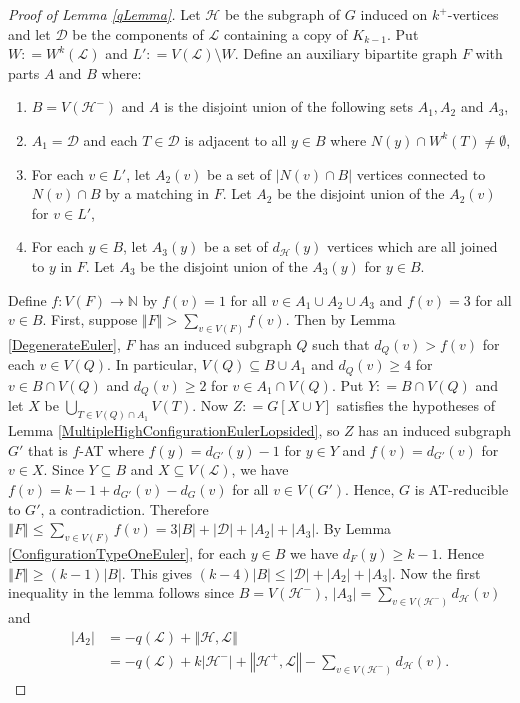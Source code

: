 \documentclass[10pt]{article}
\theoremstyle{plain}
\theoremstyle{definition}
\theoremstyle{remark}
\newcommand{\fancy}[1]{\mathcal{#1}}
\newcommand{\IN}{\mathbb{N}}
\newcommand{\D}{\fancy{D}}
\renewcommand{\L}{\fancy{L}}
\newcommand{\HH}{\fancy{H}}
\newcommand{\card}[1]{\left|#1\right|}
\newcommand{\size}[1]{\left\Vert#1\right\Vert}
\newcommand{\func}[3]{#1\colon #2 \rightarrow #3}
\newcommand{\DefinedAs}{\mathrel{\mathop:}=}
\def\D{\fancy{D}}
\begin{document}
\begin{proof}[Proof of Lemma \ref{qLemma}]
Let $\HH$ be the subgraph of $G$ induced on $k^+$-vertices and let $\D$ be the components of $\L$ containing a copy of $K_{k-1}$. 
Put $W \DefinedAs W^k(\L)$ and $L' \DefinedAs V(\L) \setminus W$. Define an auxiliary bipartite graph $F$ with parts $A$ and $B$ where:
\begin{enumerate}
\item  $B = V(\HH^-)$ and $A$ is the disjoint union of the following sets
$A_1, A_2$ and $A_3$,
\item $A_1 = \D$ and each $T \in \D$ is adjacent to all $y \in B$
where $N(y) \cap W^k(T) \ne \emptyset$,
\item For each $v \in L'$, let $A_2(v)$ be a set of $\card{N(v) \cap
B}$ vertices connected to $N(v) \cap B$ by a matching in $F$.  Let
$A_2$ be the disjoint union of the $A_2(v)$ for $v \in L'$,
\item For each $y \in B$, let $A_3(y)$ be a set of $d_{\HH}(y)$ vertices
which are all joined to $y$ in $F$.  Let $A_3$ be the disjoint union
of the $A_3(y)$ for $y \in B$.
\end{enumerate}

Define $\func{f}{V(F)}{\IN}$ by $f(v) = 1$ for all $v \in A_1 \cup A_2 \cup A_3$ and $f(v) = 3$ for all $v \in B$.  First, suppose $\size{F} > \sum_{v \in V(F)} f(v)$.  
Then by Lemma \ref{DegenerateEuler}, $F$ has an induced subgraph $Q$ such that $d_Q(v) > f(v)$ for each $v \in V(Q)$.  
In particular, $V(Q) \subseteq B \cup A_1$ and $d_Q(v) \ge 4$ for $v \in B \cap V(Q)$ and $d_Q(v) \ge 2$ for $v \in A_1 \cap V(Q)$.  
Put $Y \DefinedAs B \cap V(Q)$ and let $X$ be $\bigcup_{T \in V(Q) \cap A_1} V(T)$. 
Now $Z \DefinedAs G[X \cup Y]$ satisfies the hypotheses of Lemma \ref{MultipleHighConfigurationEulerLopsided}, so $Z$ has an induced subgraph $G'$ that is $f$-AT 
where $f(y) = d_{G'}(y) - 1$ for $y \in Y$ and $f(v) = d_{G'}(v)$ for $v \in X$.  Since $Y \subseteq B$ and $X \subseteq V(\L)$, we have $f(v) = k-1 + d_{G'}(v) - d_G(v)$ for all $v \in V(G')$.  
Hence, $G$ is AT-reducible to $G'$, a contradiction.
Therefore $\size{F} \le \sum_{v \in V(F)} f(v) = 3\card{B} + \card{\D} + \card{A_2} + \card{A_3}$. 
By Lemma \ref{ConfigurationTypeOneEuler}, for each $y \in B$ we have $d_F(y) \ge k-1$.  
Hence $\size{F} \ge (k-1)\card{B}$.  This gives $(k-4)\card{B} \le \card{\D} + \card{A_2} + \card{A_3}$.  
Now the first inequality in the lemma follows since $B = V(\HH^-)$, $\card{A_3} = \sum_{v \in V(\HH^-)} d_{\HH}(v)$ and
\begin{align*}
\card{A_2} &= -q(\L) + \size{\HH, \L} \\
&= -q(\L) + k\card{\HH^-}+ \size{\HH^+, \L} - \sum_{v \in V(\HH^-)} d_{\HH}(v).
\end{align*}


\end{proof}
\end{document}
